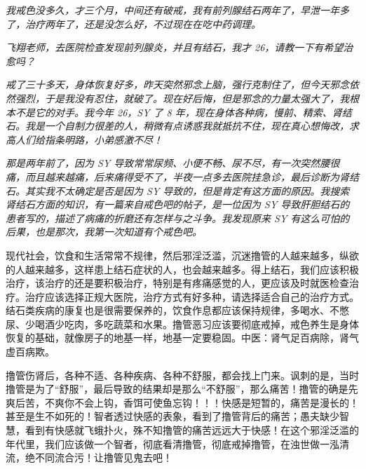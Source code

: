 \begin{case}[结石]\it
    我戒色没多久，才三个月，中间还有破戒，我有前列腺结石两年了，早泄一年多了，治疗两年了，还是没怎么好，不过现在在吃中药调理。
\end{case}

\begin{case}[结石]\it
    飞翔老师，去医院检查发现前列腺炎，并且有结石，我才 26，请教一下有希望治愈吗？
\end{case}

\begin{case}[结石]\it
    戒了三十多天，身体恢复好多，昨天突然邪念上脑，强行克制住了，但今天邪念依然强烈，于是我没有忍住，就破了。现在好后悔，但是邪念的力量太强大了，我根本不是它的对手。我今年 26，SY 了 8 年，现在身体各种病，慢前、精索、肾结石。我是一个自制力很差的人，稍微有点诱惑我就抵抗不住，现在真心想悔改，求高人们给指条明路，小弟感激不尽！
\end{case}

\begin{case}[结石]\it
    那是两年前了，因为 SY 导致常常尿频、小便不畅、尿不尽，有一次突然腰很痛，而且越来越痛，后来痛得受不了，半夜一点多去医院挂急诊，最后诊断为肾结石。其实我不太确定是否是因为 SY 导致的，但是肯定有这方面的原因。我搜索肾结石方面的知识，有一篇来自戒色吧的帖子，是一位因为 SY 导致肝胆结石的患者写的，描述了病痛的折磨还有怎样与之斗争。我发现原来 SY 有这么可怕的后果，也是那次，我第一次知道有个戒色吧。
\end{case}

现代社会，饮食和生活常常不规律，然后邪淫泛滥，沉迷撸管的人越来越多，纵欲的人越来越多，这样患上结石症状的人，也会越来越多。得上结石，我们应该积极治疗，该治疗的还是要积极治疗，特别是有疼痛感觉的人，更应该及时就医检查治疗。治疗应该选择正规大医院，治疗方式有好多种，请选择适合自己的治疗方式。结石类疾病的康复也是很需要保养的，饮食作息都应该保持规律，多喝水、不憋尿、少喝酒少吃肉，多吃蔬菜和水果。撸管恶习应该要彻底戒掉，戒色养生是身体恢复的基础，就像房子的地基一样，地基一定要稳固。中医：肾气足百病除，肾气虚百病欺。

撸管伤肾后，各种不适、各种疾病、各种不舒服，都会找上门来。讽刺的是，当时撸管是为了“舒服”，最后导致的结果却是那么“不舒服”，那么痛苦！撸管的确是先爽后苦，不爽你不会上钩，香饵可使鱼忘钩！！！快感是短暂的，痛苦是漫长的！甚至是生不如死的！智者透过快感的表象，看到了撸管背后的痛苦；愚夫缺少智慧，看到有快感就飞蛾扑火，殊不知撸管的痛苦远远大于快感！在这个邪淫泛滥的年代里，我们应该做一个智者，彻底看清撸管，彻底戒掉撸管，在浊世做一泓清流，绝不同流合污！让撸管见鬼去吧！


